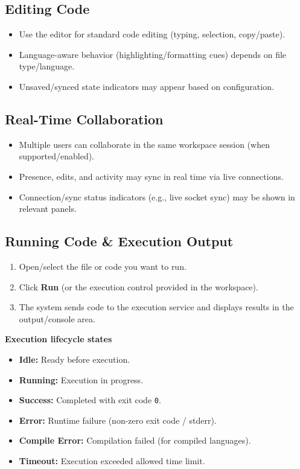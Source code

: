 \documentclass[11pt,a4paper]{article}
\begin{document}
\subsection{Editing Code}
\begin{itemize}
  \item Use the editor for standard code editing (typing, selection, copy/paste).
  \item Language-aware behavior (highlighting/formatting cues) depends on file type/language.
  \item Unsaved/synced state indicators may appear based on configuration.
\end{itemize}

\subsection{Real-Time Collaboration}
\begin{itemize}
  \item Multiple users can collaborate in the same workspace session (when supported/enabled).
  \item Presence, edits, and activity may sync in real time via live connections.
  \item Connection/sync status indicators (e.g., live socket sync) may be shown in relevant panels.
\end{itemize}

\subsection{Running Code \& Execution Output}
\begin{enumerate}
  \item Open/select the file or code you want to run.
  \item Click \textbf{Run} (or the execution control provided in the workspace).
  \item The system sends code to the execution service and displays results in the output/console area.
\end{enumerate}

\textbf{Execution lifecycle states}
\begin{itemize}
  \item \textbf{Idle:} Ready before execution.
  \item \textbf{Running:} Execution in progress.
  \item \textbf{Success:} Completed with exit code \texttt{0}.
  \item \textbf{Error:} Runtime failure (non-zero exit code / stderr).
  \item \textbf{Compile Error:} Compilation failed (for compiled languages).
  \item \textbf{Timeout:} Execution exceeded allowed time limit.
\end{itemize}
\end{document}
